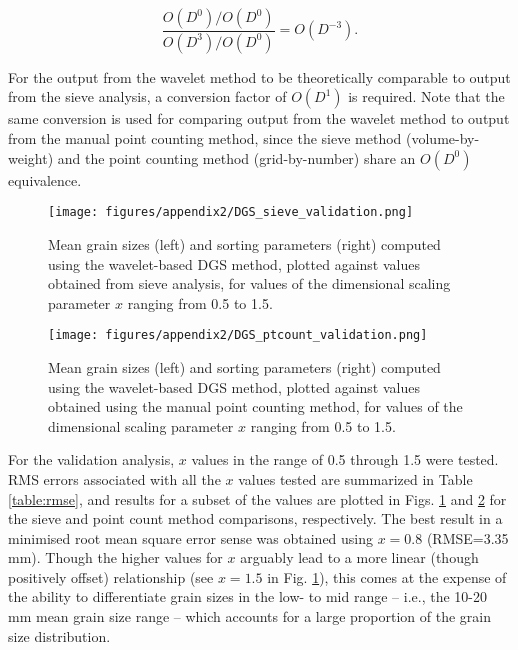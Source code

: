 \begin{equation}\label{eq:order_balance}
\frac{O(D^0)/O(D^0)}{O(D^3)/O(D^0)} = O(D^{-3}).
\end{equation} 

For the output from the wavelet method to be theoretically comparable to output from the sieve analysis, a conversion factor of $O(D^1)$ is required. Note that the same conversion is used for comparing output from the wavelet method to output from the manual point counting method, since the sieve method (volume-by-weight) and the point counting method (grid-by-number) share an $O(D^0)$ equivalence. 

\begin{figure}
	\texttt{[image: figures/appendix2/DGS\_sieve\_validation.png]}
	\caption[Mean grain size and sorting: wavelet method versus sieve]{Mean grain sizes (left) and sorting parameters (right) computed using the wavelet-based DGS method, plotted against values obtained from sieve analysis, for values of the dimensional scaling parameter $x$ ranging from 0.5 to 1.5. \label{fig:validation_sieve}}
\end{figure}

\begin{figure}
	\texttt{[image: figures/appendix2/DGS\_ptcount\_validation.png]}
	\caption[Mean grain size and sorting: wavelet method versus manual point count]{Mean grain sizes (left) and sorting parameters (right) computed using the wavelet-based DGS method, plotted against values obtained using the manual point counting method, for values of the dimensional scaling parameter $x$ ranging from 0.5 to 1.5. \label{fig:validation_ptcount}}
\end{figure}

For the validation analysis, $x$ values in the range of 0.5 through 1.5 were tested. RMS errors associated with all the $x$ values tested are summarized in Table \ref{table:rmse}, and results for a subset of the values are plotted in Figs. \ref{fig:validation_sieve} and \ref{fig:validation_ptcount} for the sieve and point count method comparisons, respectively. The best result in a minimised root mean square error sense was obtained using $x=0.8$ (RMSE=3.35 mm). Though the higher values for $x$ arguably lead to a more linear (though positively offset) relationship (see $x=1.5$ in Fig. \ref{fig:validation_sieve}), this comes at the expense of the ability to differentiate grain sizes in the low- to mid range -- i.e., the 10-20 mm mean grain size range -- which accounts for a large proportion of the grain size distribution. %

